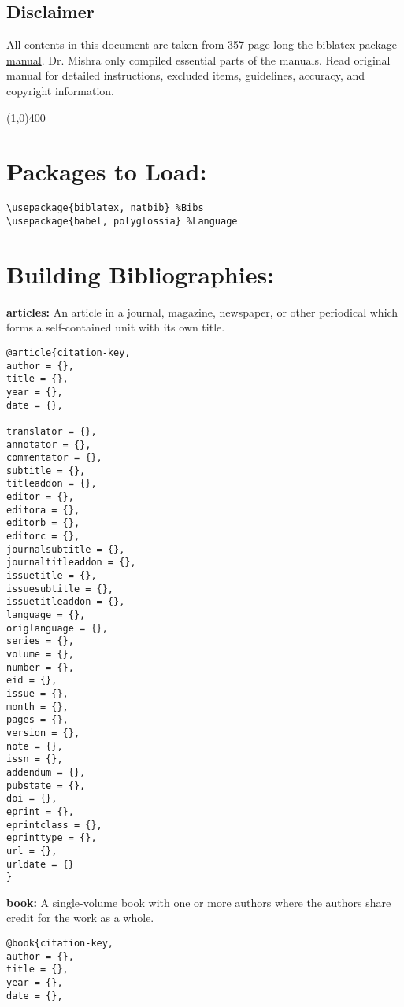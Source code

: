 \documentclass{article}
\begin{document}
\begin{multicols}{2}
\section*{Disclaimer} 
All contents in this document are taken from 357 page long \href{https://mirrors.ibiblio.org/CTAN/macros/latex/contrib/biblatex/doc/biblatex.pdf}{the biblatex package manual}. Dr. Mishra only compiled essential parts of the manuals. Read original manual for detailed instructions, excluded items, guidelines, accuracy, and copyright information.
\end{multicols}

\line(1,0){400} \\

\newpage
\begin{multicols}{2}

\section*{Packages to Load:}
\begin{verbatim}
\usepackage{biblatex, natbib} %Bibs
\usepackage{babel, polyglossia} %Language
\end{verbatim}

\section*{Building Bibliographies:}
\noindent \textbf{articles:} An article in a journal, magazine, newspaper, or other periodical which forms a self-contained unit with its own title.
\begin{verbatim}
@article{citation-key,
author = {},
title = {},
year = {},
date = {},

translator = {},
annotator = {},
commentator = {},
subtitle = {},
titleaddon = {},
editor = {},
editora = {},
editorb = {},
editorc = {},
journalsubtitle = {},
journaltitleaddon = {},
issuetitle = {},
issuesubtitle = {},
issuetitleaddon = {},
language = {},
origlanguage = {},
series = {},
volume = {},
number = {},
eid = {}, 
issue = {},
month = {},
pages = {},
version = {},
note = {},
issn = {},
addendum = {},
pubstate = {},
doi = {},
eprint = {},
eprintclass = {},
eprinttype = {},
url = {},
urldate = {}
}
\end{verbatim}

\vspace{0.5cm}
\noindent \textbf{book:} A single-volume book with one or more authors where the authors share credit for the work as a whole.
\begin{verbatim}
@book{citation-key,
author = {},
title = {}, 
year = {},
date = {},


\end{verbatim}
\end{multicols}
\end{document}

